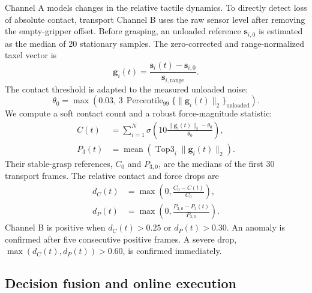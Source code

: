 Channel A models changes in the relative tactile dynamics. To directly detect
loss of absolute contact, transport Channel B uses the raw sensor level after
removing the empty-gripper offset. Before grasping, an unloaded reference
$\mathbf{s}_{i,0}$ is estimated as the median of 20 stationary samples. The
zero-corrected and range-normalized taxel vector is
%
\begin{equation}
    \mathbf{g}_i(t)
    =
    \frac{\mathbf{s}_i(t)-\mathbf{s}_{i,0}}
         {\mathbf{s}_{i,\mathrm{range}}}.
    \label{eq:zero_corrected_force}
\end{equation}
%
The contact threshold is adapted to the measured unloaded noise:
%
\begin{equation}
    \theta_0
    =
    \max\left(
    0.03,\,
    3\,\operatorname{Percentile}_{99}
    \{\|\mathbf{g}_i(t)\|_2\}_{\mathrm{unloaded}}
    \right).
    \label{eq:contact_noise_threshold}
\end{equation}
%
We compute a soft contact count and a robust force-magnitude statistic:
%
\begin{align}
    C(t)
    &=
    \sum_{i=1}^{N}
    \sigma\!\left(
    10\frac{\|\mathbf{g}_i(t)\|_2-\theta_0}{\theta_0}
    \right),                                                          
    \label{eq:absolute_contact_count}\\
    P_3(t)
    &=
    \operatorname{mean}
    \left(
    \operatorname{Top3}_{i}
    \|\mathbf{g}_i(t)\|_2
    \right).
    \label{eq:top3_force}
\end{align}
%
Their stable-grasp references, $C_0$ and $P_{3,0}$, are the medians of the
first 30 transport frames. The relative contact and force drops are
%
\begin{align}
    d_C(t)
    &=\max\left(0,\frac{C_0-C(t)}{C_0}\right),                         
    \label{eq:contact_drop}\\
    d_P(t)
    &=\max\left(0,\frac{P_{3,0}-P_3(t)}{P_{3,0}}\right).               
    \label{eq:force_drop}
\end{align}
%
Channel B is positive when $d_C(t)>0.25$ or $d_P(t)>0.30$. An anomaly is
confirmed after five consecutive positive frames. A severe drop,
$\max(d_C(t),d_P(t))>0.60$, is confirmed immediately.

\subsection{Decision fusion and online execution}
\label{sec:tactile_fusion}

